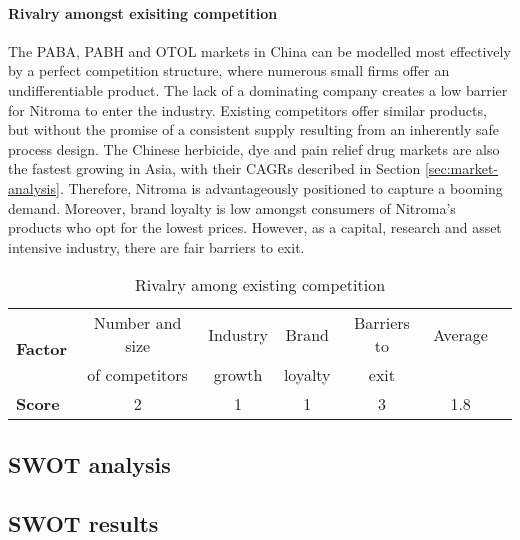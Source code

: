 \paragraph{Rivalry amongst exisiting competition}
The PABA, PABH and OTOL markets in China can be modelled most effectively by a perfect competition structure, where numerous small firms offer an undifferentiable product. The lack of a dominating company creates a low barrier for Nitroma to enter the industry. Existing competitors offer similar products, but without the promise of a consistent supply resulting from an inherently safe process design. The Chinese herbicide, dye and pain relief drug markets are also the fastest growing in Asia, with their CAGRs described in Section \ref{sec:market-analysis}. Therefore, Nitroma is advantageously positioned to capture a booming demand. Moreover, brand loyalty is low amongst consumers of Nitroma’s products who opt for the lowest prices. However, as a capital, research and asset intensive industry, there are fair barriers to exit. 
                                                        
\begin{table}[H]
\centering
\caption{Rivalry among existing competition}
\label{tab:rivalry}
\begin{tabular}{lcccccc}
\toprule
\multirow{2}{*}{\textbf{Factor}} & Number and size       & Industry   & Brand          & Barriers to    & Average   \\
                                 & of competitors        & growth     & loyalty        & exit           &           \\\midrule
\textbf{Score}                   & 2                     & 1          & 1              & 3              & 1.8       \\\bottomrule
\end{tabular}%
\end{table}

\subsection{SWOT analysis}
\subsection{SWOT results}

